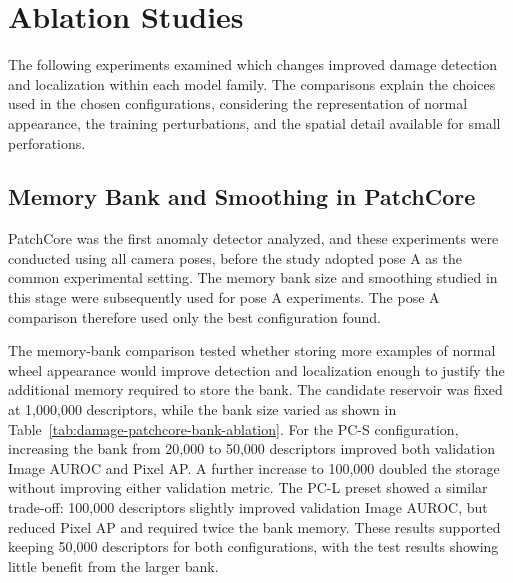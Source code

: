 \section{Ablation Studies}
\label{sec:damage-ablation-studies}

The following experiments examined which changes improved damage detection and localization within each model family. The comparisons explain the choices used in the chosen configurations, considering the representation of normal appearance, the training perturbations, and the spatial detail available for small perforations.

\subsection{Memory Bank and Smoothing in PatchCore}
\label{sec:damage-patchcore-ablation}

PatchCore was the first anomaly detector analyzed, and these experiments were conducted using all camera poses, before the study adopted pose A as the common experimental setting. The memory bank size and smoothing studied in this stage were subsequently used for pose A experiments. The pose A comparison therefore used only the best configuration found.

The memory-bank comparison tested whether storing more examples of normal wheel appearance would improve detection and localization enough to justify the additional memory required to store the bank. The candidate reservoir was fixed at 1,000,000 descriptors, while the bank size varied as shown in Table~\ref{tab:damage-patchcore-bank-ablation}. For the PC-S configuration, increasing the bank from 20,000 to 50,000 descriptors improved both validation Image AUROC and Pixel AP. A further increase to 100,000 doubled the storage without improving either validation metric. The PC-L preset showed a similar trade-off: 100,000 descriptors slightly improved validation Image AUROC, but reduced Pixel AP and required twice the bank memory. These results supported keeping 50,000 descriptors for both configurations, with the test results showing little benefit from the larger bank.

